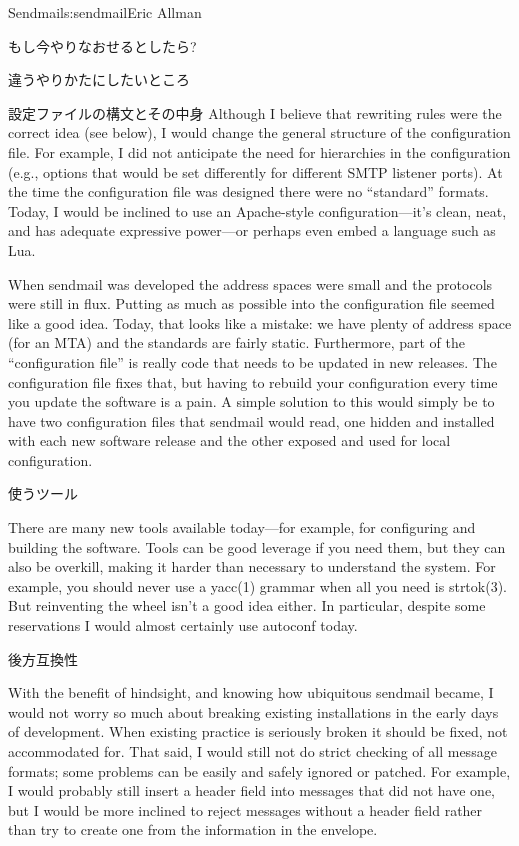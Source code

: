 \begin{aosachapter}{Sendmail}{s:sendmail}{Eric Allman}
\begin{aosasect1}{もし今やりなおせるとしたら?}
\begin{aosasect2}{違うやりかたにしたいところ}
\begin{aosasect3}{設定ファイルの構文とその中身}
Although I believe that rewriting rules were the correct idea (see
below), I would change the general structure of the configuration
file.  For example, I did not anticipate the need for hierarchies in
the configuration (e.g., options that would be set differently for
different SMTP listener ports). At the time the configuration file was
designed there were no ``standard'' formats. Today, I would be inclined
to use an Apache-style configuration---it's clean, neat, and has
adequate expressive power---or perhaps even embed a language such as Lua.

When sendmail was developed the address spaces were small and the
protocols were still in flux. Putting as much as possible into the
configuration file seemed like a good idea. Today, that looks like a
mistake: we have plenty of address space (for an MTA) and the
standards are fairly static.
Furthermore, part of the ``configuration file'' is really code
that needs to be updated in new releases.
The  configuration file fixes that,
but having to rebuild your configuration every time you update the software
is a pain.
A simple solution to this would simply be
to have two configuration files that sendmail would read, one hidden
and installed with each new software release and the other exposed and
used for local configuration.

\end{aosasect3}

\begin{aosasect3}{使うツール}

There are many new tools available today---for example, for
configuring and building the software. Tools can be good leverage if
you need them, but they can also be overkill, making it harder than
necessary to understand the system. For example, you should never use
a yacc(1) grammar when all you need is strtok(3). But reinventing the
wheel isn't a good idea either.  In particular, despite some
reservations I would almost certainly use autoconf today.

\end{aosasect3}

\begin{aosasect3}{後方互換性}

With the benefit of hindsight, and knowing how ubiquitous sendmail
became, I would not worry so much about breaking existing
installations in the early days of development.  When existing
practice is seriously broken it should be fixed, not accommodated
for. That said, I would still not do strict checking of all message
formats; some problems can be easily and safely ignored or
patched. For example, I would probably still insert a 
header field into messages that did not have one, but I would be more
inclined to reject messages without a  header field rather than
try to create one from the information in the envelope.


\end{aosasect3}
\end{aosasect2}
\end{aosasect1}
\end{aosachapter}
